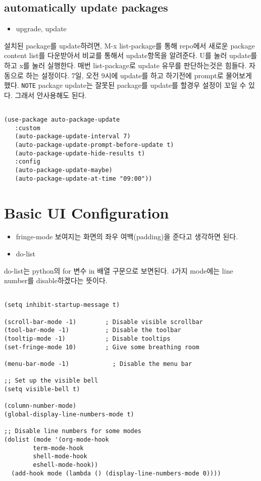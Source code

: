 \documentclass[11pt]{article}
\begin{document}
\subsection*{automatically update packages}
\label{sec:org46e3f57}
\begin{itemize}
\item upgrade, update
\end{itemize}
설치된 package를 update하려면, M-x list-package를 통해 repo에서 새로운 package content list를 다운받아서 비교를 통해서 update항목을 알려준다. U를 눌러 update를 하고 x를 눌러 실행한다. 매번 list-package로 update 유무를 판단하는것은 힘들다. 자동으로 하는 설정이다.
7일, 오전 9시에 update를 하고 하기전에 prompt로 물어보게 했다.
\texttt{NOTE}
package update는 잘못된 package를 update를 할경우 설정이 꼬일 수 있다. 그래서 안사용해도 된다.
\begin{verbatim}

(use-package auto-package-update
   :custom
   (auto-package-update-interval 7)
   (auto-package-update-prompt-before-update t)
   (auto-package-update-hide-results t)
   :config
   (auto-package-update-maybe)
   (auto-package-update-at-time "09:00"))
\end{verbatim}
\section*{Basic UI Configuration}
\label{sec:org045b668}
\begin{itemize}
\item fringe-mode
보여지는 화면의 좌우 여백(padding)을 준다고 생각하면 된다.
\item do-list
\end{itemize}
do-list는 python의 for 변수 in 배열 구문으로 보면된다.
4가지 mode에는 line number를 disable하겠다는 뜻이다.
\begin{verbatim}

(setq inhibit-startup-message t)

(scroll-bar-mode -1)        ; Disable visible scrollbar
(tool-bar-mode -1)          ; Disable the toolbar
(tooltip-mode -1)           ; Disable tooltips
(set-fringe-mode 10)        ; Give some breathing room

(menu-bar-mode -1)            ; Disable the menu bar

;; Set up the visible bell
(setq visible-bell t)

(column-number-mode)
(global-display-line-numbers-mode t)

;; Disable line numbers for some modes
(dolist (mode '(org-mode-hook
		term-mode-hook
		shell-mode-hook
		eshell-mode-hook))
  (add-hook mode (lambda () (display-line-numbers-mode 0))))

\end{verbatim}
\end{document}
